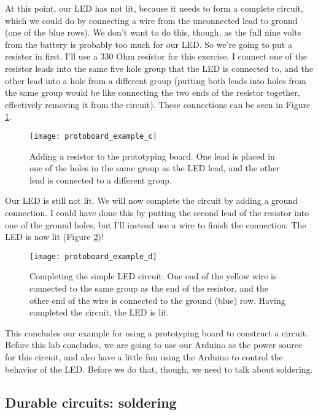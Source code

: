 At this point, our LED has not lit, because it needs to form a complete circuit,
which we could do by connecting a wire from the unconnected lead to ground
(one of the blue rows). We don't want to do this, though, as the full nine
volts from the battery is probably too much for our LED. So we're going to put
a resistor in first. I'll use a 330 Ohm resistor for this exercise. I connect
one of the resistor leads into the same five hole group that the LED is 
connected to, and the other lead into a hole from a different group (putting
both leads into holes from the same group would be like connecting the two
ends of the resistor together, effectively removing it from the circuit). These
connections can be seen in Figure \ref{fig:protoboard_example_c}.
\begin{figure}[htbp!]
\centering
\texttt{[image: protoboard\_example\_c]}
\caption[Adding a resistor to the prototyping board]{Adding a resistor to the
prototyping board. One lead is placed in one of the holes in the same group
as the LED lead, and the other lead is connected to a different group.}
\label{fig:protoboard_example_c}
\end{figure}

Our LED is still not lit. We will now complete the circuit by adding a ground
connection. I could have done this by putting the second lead of the resistor
into one of the ground holes, but I'll instead use a wire to finish the
connection. The LED is now lit (Figure \ref{fig:protoboard_example_d})!
\begin{figure}[htbp!]
\centering
\texttt{[image: protoboard\_example\_d]}
\caption[Completing the simple LED circuit]{Completing the simple LED circuit.
One end of the yellow wire is connected to the same group as the end of the
resistor, and the other end of the wire is connected to the ground (blue)
row. Having completed the circuit, the LED is lit.}
\label{fig:protoboard_example_d}
\end{figure}


This concludes our example for using a prototyping board to construct a circuit.
Before this lab concludes, we are going to use our Arduino as the power source
for this circuit, and also have a little fun using the Arduino to control the
behavior of the LED. Before we do that, though, we need to talk about soldering.

\subsection{Durable circuits: soldering}

